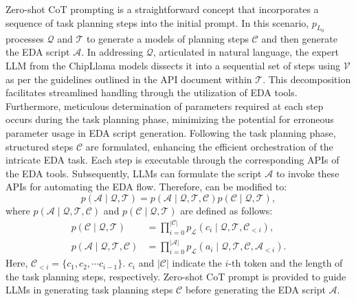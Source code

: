 Zero-shot CoT prompting is a straightforward concept that incorporates a sequence of task planning steps into the initial prompt.
In this scenario, $p_{L_{0}}$ processes $\mathcal{Q}$ and $\mathcal{T}$ to generate a models of planning steps $\mathcal{C}$ and then generate the EDA script $\mathcal{A}$. 
In addressing $\mathcal{Q}$, articulated in natural language, the expert LLM from the ChipLlama models dissects it into a sequential set of steps using $\mathcal{V}$ as per the guidelines outlined in the API document within $\mathcal{T}$. 
This decomposition facilitates streamlined handling through the utilization of EDA tools. 
Furthermore, meticulous determination of parameters required at each step occurs during the task planning phase, minimizing the potential for erroneous parameter usage in EDA script generation. 
Following the task planning phase, structured steps $\mathcal{C}$ are formulated, enhancing the efficient orchestration of the intricate EDA task. 
Each step is executable through the corresponding APIs of the EDA tools.
Subsequently, LLMs can formulate the script $\mathcal{A}$ to invoke these APIs for automating the EDA flow.
Therefore,  can be modified to: 
\begin{equation}
    p(\mathcal{A}\mid\mathcal{Q},\mathcal{T}) = p(\mathcal{A}\mid\mathcal{Q},\mathcal{T},\mathcal{C})p(\mathcal{C}\mid\mathcal{Q},\mathcal{T}),
    \label{Eq:zero-shot_CoT}
\end{equation}
where $p(\mathcal{A}\mid\mathcal{Q},\mathcal{T},\mathcal{C})$ and  $p(\mathcal{C}\mid\mathcal{Q},\mathcal{T})$ are defined as follows:
\begin{align}
    p(\mathcal{C}\mid\mathcal{Q},\mathcal{T}) &= \prod \limits_{i=0}^{|\mathcal{C}|} p_{\mathcal{L}}(c_{i}\mid\mathcal{Q},\mathcal{T},\mathcal{C}_{<i}),
    \label{Eq:zero-shot_CoT_step1} \\
    p(\mathcal{A}\mid\mathcal{Q},\mathcal{T},\mathcal{C}) &= \prod \limits_{i=0}^{|\mathcal{A}|} p_{\mathcal{L}}(a_{i}\mid\mathcal{Q},\mathcal{T},\mathcal{C},\mathcal{A}_{<i}).
    \label{Eq:zero-shot_CoT_step2}
\end{align}
Here, $\mathcal{C}_{<i} = \{c_1, c_2, \cdots c_{i-1}\}$.
$c_{i}$ and $|\mathcal{C}|$ indicate the $i$-th token and the length of the task planning steps, respectively. 
Zero-shot CoT prompt is provided to guide LLMs in generating task planning steps $\mathcal{C}$ before generating the EDA script $\mathcal{A}$.

